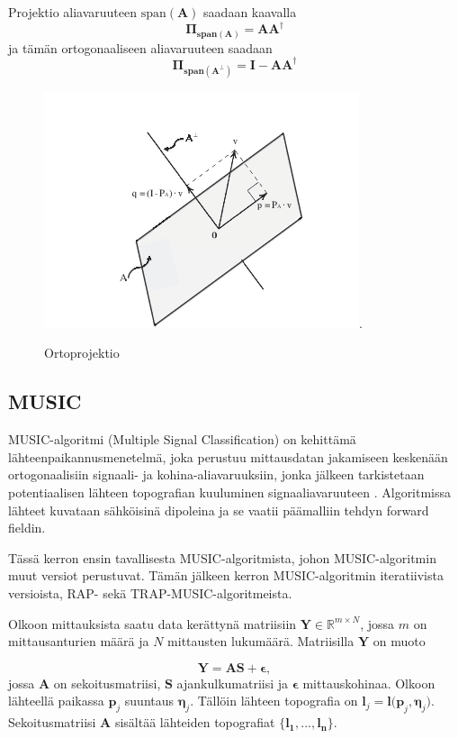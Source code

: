 Projektio aliavaruuteen $\text{span}(\mathbf{A})$ saadaan kaavalla
\begin{equation}
    \mathbf{\Pi_{span(A)} = AA^{\dagger}}
\end{equation}
ja tämän ortogonaaliseen aliavaruuteen saadaan
\begin{equation}
    \mathbf{\Pi_{span(A^{\bot})}=I-AA^{\dagger}}
\end{equation}
\begin{figure}[ht]
    \centering
    \includegraphics{ortoprojektio.png}.
    \caption{Ortoprojektio}
\end{figure}

\clearpage
\subsection{MUSIC}
MUSIC-algoritmi (Multiple Signal Classification) on \cite{Schmidt1986MultipleEstimation} kehittämä lähteenpaikannusmenetelmä, joka perustuu mittausdatan jakamiseen keskenään ortogonaalisiin signaali- ja kohina-aliavaruuksiin, jonka jälkeen tarkistetaan potentiaalisen lähteen topografian kuuluminen signaaliavaruuteen \citep{Mosher1999SourceMUSIC}. Algoritmissa lähteet kuvataan sähköisinä dipoleina ja se vaatii päämalliin tehdyn forward fieldin.

Tässä kerron ensin tavallisesta MUSIC-algoritmista, johon MUSIC-algoritmin muut versiot perustuvat. Tämän jälkeen kerron MUSIC-algoritmin iteratiivista versioista, RAP- sekä TRAP-MUSIC-algoritmeista.

Olkoon mittauksista saatu data kerättynä matriisiin $\mathbf{Y}\in \mathbb{R}^{m\times N}$, jossa $\mathit{m}$ on mittausanturien määrä ja $\mathit{N}$ mittausten lukumäärä. Matriisilla $\mathbf{Y}$ on muoto

\begin{equation}
    \mathbf{Y=AS+\epsilon},
\end{equation}
jossa $\mathbf{A}$ on sekoitusmatriisi, $\mathbf{S}$ ajankulkumatriisi ja $\mathbf{\epsilon}$ mittauskohinaa. Olkoon lähteellä paikassa $\mathbf{p}_j$ suuntaus $\mathbf{\eta}_j$. Tällöin lähteen topografia on $\mathbf{l}_j=\mathbf{l(p}_j,\mathbf{\eta}_j)$. Sekoitusmatriisi $\mathbf{A}$ sisältää lähteiden topografiat $\mathbf{\{l_1,...,l_n\}}$.

